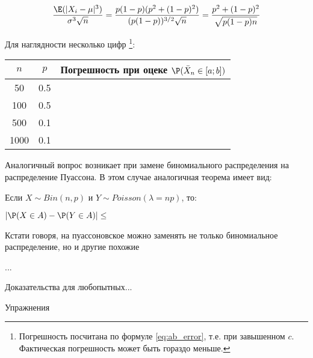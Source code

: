 \begin{equation}
\frac{\E(|X_{i}-\mu|^{3})}{\sigma^{3}\sqrt{n}}=\frac{p(1-p)(p^{2}+(1-p)^{2})}{(p(1-p))^{3/2}\sqrt{n}}=\frac{p^{2}+(1-p)^{2}}{\sqrt{p(1-p)n}}
\end{equation}


Для наглядности несколько цифр%
\footnote{Погрешность посчитана по формуле \ref{eq:ab_error}, т.е. при завышенном
$c$. Фактическая погрешность может быть гораздо меньше.%
}:

\begin{tabular}{|c|c|c|}
\hline 
$n$ & $p$ & Погрешность при оцеке $\P(\bar{X}_{n}\in[a;b])$\tabularnewline
\hline 
\hline 
50 & 0.5 & \tabularnewline
\hline 
100 & 0.5 & \tabularnewline
\hline 
500 & 0.1 & \tabularnewline
\hline 
1000 & 0.1 & \tabularnewline
\hline 
\end{tabular}

Аналогичный вопрос возникает при замене биномиального распределения
на распределение Пуассона. В этом случае аналогичная теорема имеет
вид:

Если $X\sim Bin(n,p)$ и $Y\sim Poisson(\lambda=np)$, то:

$|\P(X\in A)-\P(Y\in A)|\leq$

Кстати говоря, на пуассоновское можно заменять не только биномиальное
распределение, но и другие похожие

...

Доказательства для любопытных...

Упражнения
